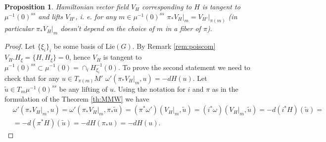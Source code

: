 \documentclass[12pt]{article}
\newtheorem{pr}{Proposition}[section]
\numberwithin{equation}{section}
\theoremstyle{definition}
\begin{document}
\begin{pr}\label{tangenth}
    Hamiltonian vector field $V_{H}$ corresponding to $H$ is tangent to $\mu^{-1}(0)^{ss}$ and lifts $V_{H'}$, i. e. for any $m \in \mu^{-1}(0)^{ss}$ $\pi_{*}V_{H}\big|_{m} = V_{H'}\big|_{\pi(m)}$ (in particular $\pi_{*}V_{H}\big|_{m}$ doesn't depend on the choice of $m$ in a fiber of $\pi$).
\end{pr}
\begin{proof}
    Let $\{\xi_{i}\}_{i}$ be some basis of $\mathrm{Lie}(G)$. By Remark \ref{rem:poiscom} $V_{H}.H_{\xi} = \{H, H_{\xi}\} = 0$, hence $V_{H}$ is tangent to $\mu^{-1}(0)^{ss} \subset \mu^{-1}(0) = \cap_{i}H_{\xi_{i}}^{-1}(0)$. To prove the second statement we need to check that for any $u \in T_{\pi(m)}M'$ $\omega'(\pi_{*}V_{H}\big|_{m}, u) = -dH(u)$. Let $\tilde{u} \in T_{m}\mu^{-1}(0)^{ss}$ be any lifting of $u$. Using the notation for $i$ and $\pi$ as in the formulation of the Theorem \ref{th:MMW} we have
\begin{align*}
    &\omega'(\pi_{*}V_{H}\big|_{m}, u) = \omega'(\pi_{*}V_{H}\big|_{m}, \pi_{*}\tilde{u}) = (\pi^{*}\omega')(V_{H}\big|_{m},\tilde{u}) = (i^{*}\omega)(V_{H}\big|_{m},\tilde{u}) = -d(i^{*}H)(\tilde{u}) =\\
    &=-d(\pi^{*}H)(\tilde{u}) = -dH(\pi_{*}u)=-dH(u).
\end{align*}
\end{proof}
\end{document}
